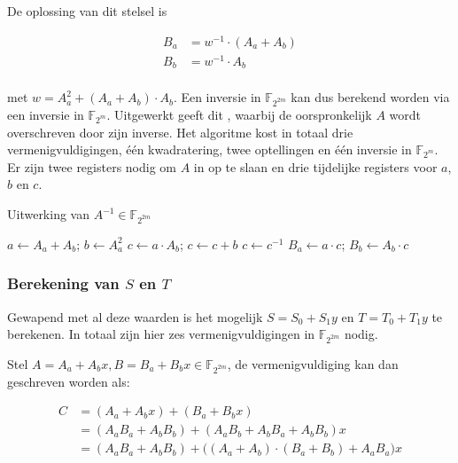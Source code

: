 De oplossing van dit stelsel is

\[\begin{aligned}
B_a	&= w^{-1} \cdot (A_a + A_b)\\
B_b	&= w^{-1} \cdot A_b\\
\end{aligned}\]

met $w = A_a^2 + (A_a + A_b) \cdot A_b$. Een inversie in $\mathbb{F}_{2^{2m}}$ kan dus berekend worden via een inversie in $\mathbb{F}_{2^m}$. Uitgewerkt geeft dit , waarbij de oorspronkelijk $A$ wordt overschreven door zijn inverse. Het algoritme kost in totaal drie vermenigvuldigingen, \'e\'en kwadratering, twee optellingen en \'e\'en inversie in $\mathbb{F}_{2^m}$. Er zijn twee registers nodig om $A$ in op te slaan en drie tijdelijke registers voor $a$, $b$ en $c$.

\begin{algorithm}[h]
	\caption{Uitwerking van $A^{-1} \in \mathbb{F}_{2^{2m}}$}
	\label{algoritme-implementatie-miller-f2m-inverse}
	$a \leftarrow A_a + A_b$; $b \leftarrow A_a^2$\;
	$c \leftarrow a \cdot A_b$; $c \leftarrow c + b$\;
	$c \leftarrow c^{-1}$\;
	$B_a \leftarrow a \cdot c$; $B_b \leftarrow A_b \cdot c$\;
\end{algorithm}

\subsubsection{Berekening van $S$ en $T$}

Gewapend met al deze waarden is het mogelijk $S = S_0 + S_1 y$ en $T = T_0 + T_1 y$ te berekenen. In totaal zijn hier zes vermenigvuldigingen in $\mathbb{F}_{2^{2m}}$ nodig. 

Stel $A = A_a + A_b x, B = B_a + B_b x \in \mathbb{F}_{2^{2m}}$, de vermenigvuldiging kan dan geschreven worden als:

\[\begin{aligned}
C	&= (A_a + A_b x) + (B_a + B_b x)\\
	&= (A_a B_a + A_b B_b) + (A_a B_b + A_b B_a + A_b B_b)x\\
	&= (A_a B_a + A_b B_b) + \bigl( (A_a + A_b) \cdot (B_a + B_b) + A_a B_a \bigr) x\\
\end{aligned}\]

